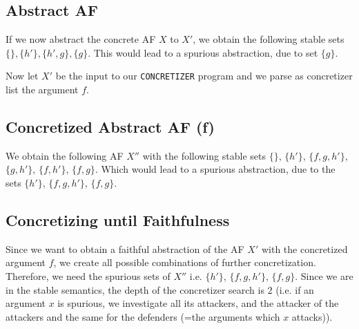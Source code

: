 \documentclass[twoside,openright]{scrreprt}
\begin{document}
\subsection{Abstract AF}
If we now abstract the concrete AF $X$ to $X'$, we obtain the following stable sets $\{\}, \{h'\}, \{h', g\}, \{g\}$.
This would lead to a spurious abstraction, due to set $\{g\}$.
\begin{center}
\end{center}
Now let $X'$ be the input to our \texttt{CONCRETIZER} program and we parse as concretizer list the argument $f$.

\subsection{Concretized Abstract AF (f)}
We obtain the following AF $X''$ with the following stable sets $\{\}$, $\{h'\}$, $\{f, g, h'\}$, $\{g, h'\}$, $\{f, h'\}$, $\{f, g\}$.
Which would lead to a spurious abstraction, due to the sets $\{h'\}$, $\{f, g, h'\}$, $\{f, g\}$.
\begin{center}
\end{center}

\subsection{Concretizing until Faithfulness}
Since we want to obtain a faithful abstraction of the AF $X'$ with the concretized argument $f$, we create all possible combinations of further concretization.
Therefore, we need the spurious sets of $X''$ i.e. $\{h'\}$, $\{f, g, h'\}$, $\{f, g\}$. Since we are in the stable semantics, the depth of the concretizer search
is $2$ (i.e. if an argument $x$ is spurious, we investigate all its attackers, and the attacker of the attackers and the same for the defenders (=the arguments which $x$ attacks)).
\end{document}
